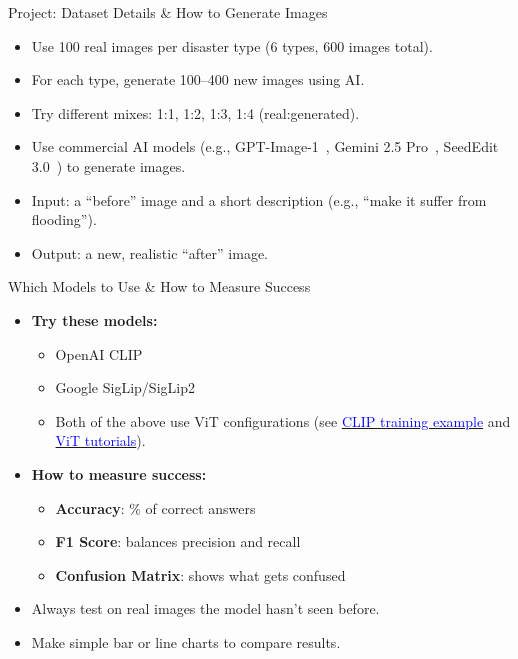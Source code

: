 \begin{refsection}
\begin{frame}{Project: Dataset Details \& How to Generate Images}
  \begin{itemize}
    \item Use 100 real images per disaster type (6 types, 600 images total).
    \item For each type, generate 100–400 new images using AI.
    \item Try different mixes: 1:1, 1:2, 1:3, 1:4 (real:generated).
    \item Use commercial AI models (e.g., GPT-Image-1~\parencite{gptimage1}, Gemini 2.5 Pro~\parencite{geminiteamgoogleGemini25Pushing}, SeedEdit 3.0~\parencite{wang2025seedit}) to generate images.
    \item Input: a “before” image and a short description (e.g., “make it suffer from flooding”).
    \item Output: a new, realistic “after” image.
  \end{itemize}
  \bottomleftrefs
\end{frame}
\end{refsection}

\begin{refsection}
\begin{frame}{Which Models to Use \& How to Measure Success}
  \begin{itemize}
    \item \textbf{Try these models:}
      \begin{itemize}
        \item OpenAI CLIP~\parencite{radfordLearningTransferableVisual2021}
        \item Google SigLip/SigLip2~\parencite{tschannenSigLIP2Multilingual2025,Zhai_2023_ICCV}
        \item Both of the above use ViT configurations (see \href{https://github.com/huggingface/transformers/blob/main/examples/pytorch/contrastive-image-text/README.md}{\textcolor{blue}{CLIP training example}} and \href{https://github.com/NielsRogge/Transformers-Tutorials/tree/master/VisionTransformer}{\textcolor{blue}{ViT tutorials}}).
      \end{itemize}
    \item \textbf{How to measure success:}
      \begin{itemize}
        \item \textbf{Accuracy}: \% of correct answers
        \item \textbf{F1 Score}: balances precision and recall
        \item \textbf{Confusion Matrix}: shows what gets confused
      \end{itemize}
    \item Always test on real images the model hasn’t seen before.
    \item Make simple bar or line charts to compare results.
  \end{itemize}
  \bottomleftrefs
\end{frame}
\end{refsection}

